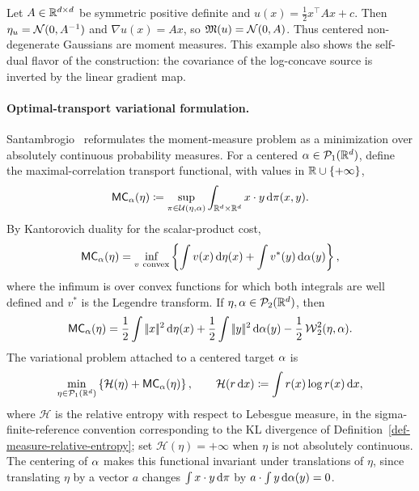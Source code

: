 \begin{example}\label{ex-moment-measure-gaussian}
	Let $A\in\mathbb{R}^{d\times d}$ be symmetric positive definite and $u(x)=\frac12 x^\top A x + c$. Then $\eta_u=\mathcal{N}(0,A^{-1})$ and $\nabla u(x)=Ax$, so $\mathfrak M(u)=\mathcal{N}(0,A)$.
	Thus centered non-degenerate Gaussians are moment measures. This example also shows the self-dual flavor of the construction: the covariance of the log-concave source is inverted by the linear gradient map.
\end{example}

\paragraph{Optimal-transport variational formulation.}
Santambrogio~\cite{Santambrogio2015MomentMeasures} reformulates the moment-measure problem as a minimization over absolutely continuous probability measures. For a centered $\alpha\in\mathcal{P}_1(\mathbb{R}^d)$, define the maximal-correlation transport functional, with values in $\mathbb{R}\cup\{+\infty\}$,
\begin{equation}\label{eq-moment-max-correlation}
	\mathsf{MC}_\alpha(\eta)
	\coloneqq
	\sup_{\pi\in\mathcal{U}(\eta,\alpha)}
	\int_{\mathbb{R}^d\times\mathbb{R}^d} x\cdot y\,\mathrm{d}\pi(x,y).
\end{equation}
By Kantorovich duality for the scalar-product cost,
\begin{equation}\label{eq-moment-max-correlation-dual}
	\mathsf{MC}_\alpha(\eta)
	=
	\inf_{v\ \mathrm{convex}}
	\left\{
		\int v(x)\,\mathrm{d}\eta(x)+\int v^*(y)\,\mathrm{d}\alpha(y)
	\right\},
\end{equation}
where the infimum is over convex functions for which both integrals are well defined and $v^*$ is the Legendre transform. If $\eta,\alpha\in\mathcal{P}_2(\mathbb{R}^d)$, then
\begin{equation}\label{eq-moment-correlation-w2}
	\mathsf{MC}_\alpha(\eta)
	=
	\frac12\int |\!| x |\!|^2\,\mathrm{d}\eta(x)
	+
	\frac12\int |\!| y |\!|^2\,\mathrm{d}\alpha(y)
	-
	\frac12\operatorname{\mathcal{W}}_2^2(\eta,\alpha).
\end{equation}
The variational problem attached to a centered target $\alpha$ is
\begin{equation}\label{eq-moment-measure-variational}
	\min_{\eta\in\mathcal{P}_1(\mathbb{R}^d)}
	\left\{
		\mathcal H(\eta)+\mathsf{MC}_\alpha(\eta)
	\right\},
	\qquad
		\mathcal H(r\,\mathrm{d} x)\coloneqq \int r(x)\log r(x)\,\mathrm{d} x,
\end{equation}
where $\mathcal H$ is the relative entropy with respect to Lebesgue measure, in the sigma-finite-reference convention corresponding to the KL divergence of Definition~\ref{def-measure-relative-entropy}; set $\mathcal H(\eta)=+\infty$ when $\eta$ is not absolutely continuous.
The centering of $\alpha$ makes this functional invariant under translations of $\eta$, since translating $\eta$ by a vector $a$ changes $\int x\cdot y\,\mathrm{d}\pi$ by $a\cdot\int y\,\mathrm{d}\alpha(y)=0$.


